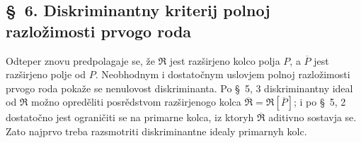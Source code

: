 \documentclass[11pt]{article}
\begin{document}
\setcounter{footnote}{26}

\subsection*{\S~6. Diskriminantny kriterij polnoj razložimosti prvogo roda}

Odteper znovu predpolagaje se, že $\mathfrak R$ jest razširjeno kolco polja $P$, a $\overline P$ jest razširjeno polje od $P$. Neobhodnym i dostatočnym uslovjem polnoj razložimosti prvogo roda pokaže se nenulovost diskriminanta. Po \S~5, 3 diskriminantny ideal od $\mathfrak R$ možno opreděliti posrědstvom razširjenogo kolca $\overline{\mathfrak R}=\mathfrak R[\overline P]$; i po \S~5, 2 dostatočno jest ograničiti se na primarne kolca, iz ktoryh $\overline{\mathfrak R}$ aditivno sostavja se. Zato najprvo treba razsmotriti diskriminantne idealy primarnyh kolc.
\end{document}
